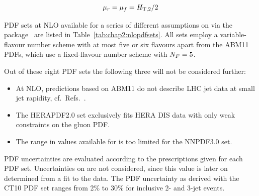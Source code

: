 \begin{equation}
  \mu_r = \mu_f = H_{\mathrm{T,2}}/2
\end{equation}

PDF sets at NLO available for a series of
different assumptions on \alpsmz via the \LHAPDFS
package~\cite{Buckley:2014ana} are listed in
Table~\ref{tab:chap2:nlopdfsets}. All sets employ a variable-flavour
number scheme with at most five or six flavours apart from the ABM11
PDFs, which use a fixed-flavour number scheme with $N_F=5$.

Out of these eight PDF sets the following three will not be considered
further:
%
\begin{itemize}
\item At NLO, predictions based on ABM11 do not describe LHC jet data
  at small jet rapidity, cf.\ Refs.~\cite{Aad:2013lpa,Aad:2014vwa}.
\item The HERAPDF2.0 set exclusively fits HERA DIS data with only weak
  constraints on the gluon PDF\@.
\item The range in values available for \alpsmz is too limited for the
  NNPDF3.0 set.
\end{itemize}
%
PDF uncertainties are evaluated according to the prescriptions given
for each PDF set. Uncertainties on \alpsmz are not considered, since
this value is later on determined from a fit to the data. The PDF
uncertainty as derived with the CT10 PDF set ranges from 2\% to 30\%
for inclusive 2- and 3-jet events.

